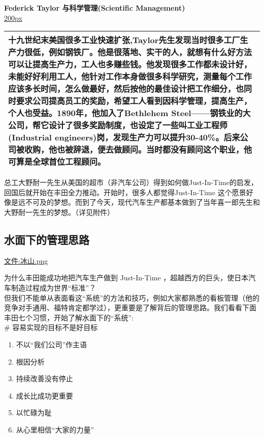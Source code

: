 \documentclass[]{article}
\providecommand{\tightlist}{%
  \setlength{\itemsep}{0pt}\setlength{\parskip}{0pt}}
\begin{document}
\textbf{Federick Taylor 与科学管理(Scientific Management)}\\
\href{文件:Weisbord_P34.jpg}{200px}

\begin{longtable}[]{@{}l@{}}
\toprule
\endhead
十九世纪末美国很多工业快速扩张,Taylor先生发现当时很多工厂生产力很低，例如钢铁厂。他是很落地、实干的人，就想有什么好方法可以让提高生产力，工人也多赚些钱。他发现很多工作都未设计好，未能好好利用工人，他针对工作本身做很多科学研究，测量每个工作应该多长时间，怎么做最好，然后按他的最佳设计把工作细分，也同时要求公司提高员工的奖励，希望工人看到因科学管理，提高生产，个人也受益。1890年，他加入了Bethlehem
Steel------钢铁业的大公司，帮它设计了很多奖励制度，也设定了一些叫工业工程师(Industrial
engineers)岗，发现生产力可以提升30-40\%。后来公司被收购，他也被辞退，便去做顾问。当时都没有顾问这个职业，他可算是全球首位工程顾问。\tabularnewline
\bottomrule
\end{longtable}

总工大野耐一先生从美国的超市（非汽车公司）得到如何做Just-In-Time的启发，回国后就开始在丰田全力推动。开始时，很多人都觉得Just-In-Time
这个愿景好像是远不可及的梦想。而到了今天，现代汽车生产都基本做到了当年喜一郎先生和大野耐一先生的梦想。（详见附件）

\hypertarget{ux6c34ux9762ux4e0bux7684ux7ba1ux7406ux601dux8def}{%
\subsection{水面下的管理思路}\label{ux6c34ux9762ux4e0bux7684ux7ba1ux7406ux601dux8def}}

\url{文件:冰山.png}

为什么丰田能成功地把汽车生产做到 Just-In-Time
，超越西方的巨头，使日本汽车制造过程成为世界``标准''？\\
但我们不能单从表面看这``系统''的方法和技巧，例如大家都熟悉的看板管理（他的竞争对手通用、福特肯定都学过），更重要是了解背后的管理思路。我们看看下面丰田七个习惯，开始了解水面下的``系统'':\\
\# 容易实现的目标不是好目标

\begin{enumerate}
\tightlist
\item
  不以``我们公司''作主语
\item
  根因分析
\item
  持续改善没有停止
\item
  成长比成功更重要
\item
  以忙碌为耻
\item
  从心里相信``大家的力量''
\end{enumerate}
\end{document}
